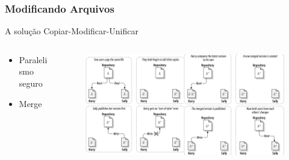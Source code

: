 \documentclass{beamer}
\begin{document}
\begin{frame}
    \frametitle{Modificando Arquivos}
    \begin{block}{A solu\c{c}\~ao Copiar-Modificar-Unificar}
        \begin{columns}
            \begin{column}{.3\textwidth}
                \begin{itemize}
                    \item Paralelismo seguro
                    \item Merge
                \end{itemize}
            \end{column}
            \begin{column}{.7\textwidth}
                \begin{figure}
                    \includegraphics[width=1.0\textwidth]{figures/copymodifymerge}
                \end{figure}
            \end{column}
        \end{columns}
    \end{block}
\end{frame}
\end{document}
